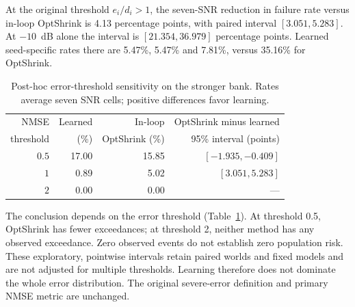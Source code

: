 At the original threshold $e_i/d_i>1$, the seven-SNR reduction in
failure rate versus in-loop OptShrink is
4.13
percentage points, with paired interval
$[3.051,5.283]$.
At $-10$~dB alone the interval is
$[21.354,36.979]$
percentage points. Learned seed-specific rates there are
5.47\%, 5.47\% and 7.81\%, versus 35.16\% for OptShrink.

\begin{table}[!t]
\caption{Post-hoc error-threshold sensitivity on the stronger bank.
Rates average seven SNR cells; positive differences favor learning.}
\label{tab:tails}\centering\footnotesize\setlength{\tabcolsep}{3pt}
\begin{tabular}{@{}rrrr@{}}\toprule
NMSE & Learned & In-loop & OptShrink minus learned\\
threshold & (\%) & OptShrink (\%) & 95\% interval (points)\\\midrule
$0.5$ & 17.00 & 15.85 & $[-1.935,-0.409]$\\
$1$ & 0.89 & 5.02 & $[3.051,5.283]$\\
$2$ & 0.00 & 0.00 & ---\\
\bottomrule\end{tabular}
\end{table}
The conclusion depends on the error threshold (Table~\ref{tab:tails}).
At threshold 0.5, OptShrink has fewer exceedances; at threshold 2,
neither method has any observed exceedance. Zero observed events do not
establish zero population risk. These exploratory, pointwise intervals
retain paired worlds and fixed models and are not adjusted for multiple
thresholds. Learning therefore does not dominate the whole error
distribution. The original severe-error definition and primary NMSE
metric are unchanged.
